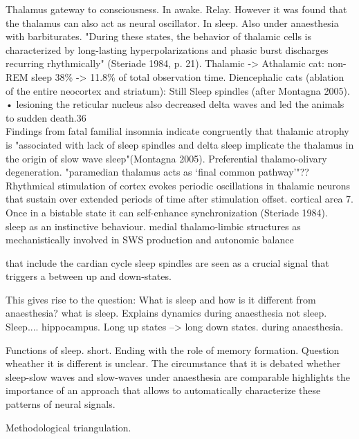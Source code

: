 Thalamus gateway to consciousness. In awake. Relay. However it was found that the thalamus can also act as neural oscillator. In sleep. Also under anaesthesia with barbiturates. "During these states, the behavior of thalamic cells is characterized by long-lasting hyperpolarizations and phasic burst discharges recurring rhythmically" (Steriade 1984, p. 21). Thalamic -> Athalamic cat: non-REM sleep 38\% -> 11.8\% of total observation time. Diencephalic cats (ablation of the entire neocortex and striatum): Still Sleep spindles (after Montagna 2005).\\
•	lesioning the reticular nucleus also decreased delta waves and led the animals to sudden death.36 \\
 Findings from fatal familial insomnia indicate congruently that thalamic atrophy is "associated with lack of sleep spindles and delta sleep implicate the thalamus in the origin of slow wave sleep"(Montagna 2005). Preferential thalamo-olivary degeneration. "paramedian thalamus acts as ‘final common pathway’"??\\

Rhythmical stimulation of cortex evokes periodic oscillations in thalamic neurons that sustain over extended periods of time after stimulation offset.  cortical area 7. Once in a bistable state it can self-enhance synchronization (Steriade 1984).\\

sleep as an instinctive behaviour.	medial thalamo-limbic structures as mechanistically involved in SWS production and autonomic balance


that include the cardian cycle sleep spindles are seen as a crucial signal that triggers a between up and down-states. 

This gives rise to the question: What is sleep and how is it different from anaesthesia? what is sleep.
Explains dynamics during anaesthesia not sleep. Sleep.... hippocampus.
Long up states --> long down states. during anaesthesia. 

Functions of sleep. short. Ending with the role of memory formation. Question wheather it is different is unclear.
The circumstance that it is debated whether sleep-slow waves and slow-waves under anaesthesia are comparable highlights the importance of an approach that allows to automatically characterize these patterns of neural signals. 


Methodological triangulation.



